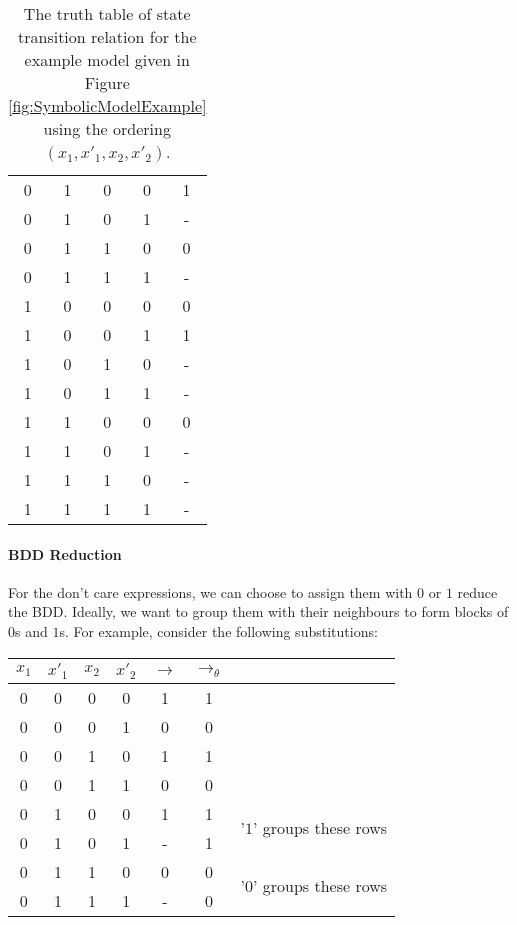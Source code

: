 \documentclass{article}
\theoremstyle{plain}
\theoremstyle{definition}
\begin{document}
\begin{multicols}{2}
\begin{table}[H]
\begin{tabular}{ c c | c c | c }
0 & 1 & 0 & 0 & 1\\
0 & 1 & 0 & 1 & -\\
0 & 1 & 1 & 0 & 0\\
0 & 1 & 1 & 1 & -\\
\hline

1 & 0 & 0 & 0 & 0\\
1 & 0 & 0 & 1 & 1\\
1 & 0 & 1 & 0 & -\\
1 & 0 & 1 & 1 & -\\
\hline

1 & 1 & 0 & 0 & 0\\
1 & 1 & 0 & 1 & -\\
1 & 1 & 1 & 0 & -\\
1 & 1 & 1 & 1 & -\\

\end{tabular}
\caption{The truth table of state transition relation for the example model given in Figure \ref{fig:SymbolicModelExample} using the ordering $(x_1, x'_1, x_2, x'_2)$.}
\end{table}

\paragraph{BDD Reduction} For the don't care expressions, we can choose to assign them with $0$ or $1$ reduce the BDD. Ideally, we want to group them with their neighbours to form blocks of $0$s and $1$s. For example, consider the following substitutions:


\begin{table}[H]
\centering
\begin{tabular}{ c c | c c | c | c | p{} }
$x_1$ & $x'_1$ & $x_2$ & $x'_2$ & $\rightarrow$ & $\rightarrow_\theta$ &  \\
\hline

0 & 0 & 0 & 0 & 1 & 1 & \\
0 & 0 & 0 & 1 & 0 & 0 & \\
0 & 0 & 1 & 0 & 1 & 1 & \\
0 & 0 & 1 & 1 & 0 & 0 & \\
\hline

0 & 1 & 0 & 0 & 1 & 1 & \multirow{2}{2cm}{\footnotesize '$1$' groups these rows} \\
0 & 1 & 0 & 1 & - & 1 & \\
\cline{7-7}
0 & 1 & 1 & 0 & 0 & 0 & \multirow{2}{2cm}{\footnotesize '$0$' groups these rows} \\
0 & 1 & 1 & 1 & - & 0 & \\
\hline


\end{tabular}
\end{table}
\end{multicols}
\end{document}
